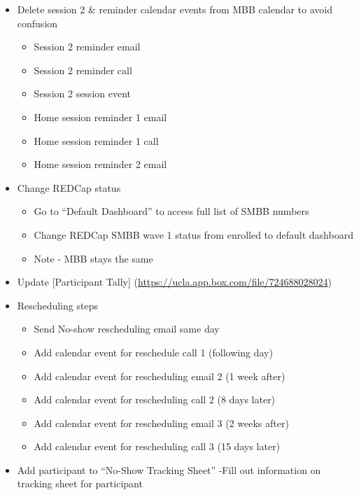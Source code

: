 \documentclass[]{book}
\providecommand{\tightlist}{%
  \setlength{\itemsep}{0pt}\setlength{\parskip}{0pt}}
\begin{document}
\begin{itemize}
\tightlist
\item
  Delete session 2 \& reminder calendar events from MBB calendar to avoid confusion

  \begin{itemize}
  \tightlist
  \item
    Session 2 reminder email
  \item
    Session 2 reminder call
  \item
    Session 2 session event
  \item
    Home session reminder 1 email
  \item
    Home session reminder 1 call
  \item
    Home session reminder 2 email
  \end{itemize}
\item
  Change REDCap status

  \begin{itemize}
  \tightlist
  \item
    Go to ``Default Dashboard'' to access full list of SMBB numbers
  \item
    Change REDCap SMBB wave 1 status from enrolled to default dashboard
  \item
    Note - MBB stays the same
  \end{itemize}
\item
  Update {[}Participant Tally{]} (\url{https://ucla.app.box.com/file/724688028024})
\item
  Rescheduling steps

  \begin{itemize}
  \tightlist
  \item
    Send No-show rescheduling email same day
  \item
    Add calendar event for reschedule call 1 (following day)
  \item
    Add calendar event for rescheduling email 2 (1 week after)
  \item
    Add calendar event for rescheduling call 2 (8 days later)
  \item
    Add calendar event for rescheduling email 3 (2 weeks after)
  \item
    Add calendar event for rescheduling call 3 (15 days later)
  \end{itemize}
\item
  Add participant to ``No-Show Tracking Sheet''
  -Fill out information on tracking sheet for participant
\end{itemize}
\end{document}

